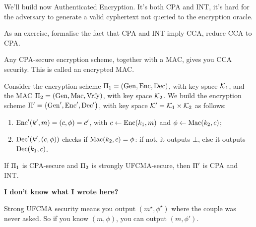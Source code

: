 We'll build now Authenticated Encryption.
It's both \ac{CPA} and \ac{INT}, \ie it's hard for the adversary to generate a valid cyphertext not queried to the encryption oracle.

As an exercise, formalise the fact that \ac{CPA} and \ac{INT} imply \ac{CCA}, \ie reduce \ac{CCA} to \ac{CPA}.

Any \ac{CPA}-secure encryption scheme, together with a \ac{MAC}, gives you \ac{CCA} security.
This is called an encrypted \ac{MAC}.

\begin{construction}
	Consider the encryption scheme $\SKESchemeTuple[1]$, with key space $\K_1$, and the \ac{MAC} $\GenericMACSchemeTuple[2]$, with key space $\K_2$.
	We build the encryption scheme $\CCASchemeTuple$, with key space $\K' = \K_1 \times \K_2$ as follows:
	\begin{enumerate}
		\item $\CCAEnc(k', m) = (c, \phi) = c'$, with $c \from \SKEEnc(k_1, m)$ and $\phi \from \GenericMac(k_2, c)$;
		\item $\CCADec(k', (c, \phi))$ checks if $\GenericMac(k_2, c) = \phi$: if not, it outputs $\bot$, else it outputs $\SKEDec(k_1, c)$. \qedhere
	\end{enumerate}
\end{construction}

\begin{theorem} \label{thm:cpa-int-encrypted-mac}
	If $\SKEScheme[1]$ is \ac{CPA}-secure and $\GenericMACScheme[2]$ is strongly \ac{UFCMA}-secure, then $\CCAScheme$ is \ac{CPA} and \ac{INT}.
\end{theorem}

\begin{framed}
	{\bfseries I don't know what I wrote here?}

	Strong \ac{UFCMA} security means you output $(m^{\star}, \phi^{\star})$ where the couple was never asked.
	So if you know $(m, \phi)$, you can output $(m, \phi')$.
\end{framed}

